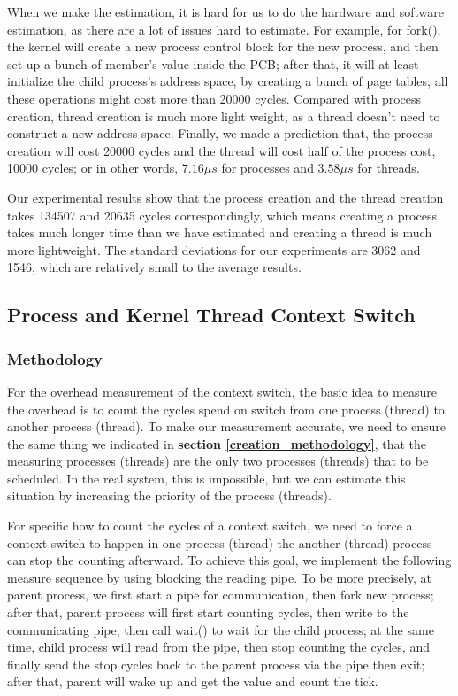 When we make the estimation, it is hard for us to do the hardware and software estimation, as there are a lot of issues hard to estimate. For example, for fork(), the kernel will create a new process control block for the new process, and then set
up a bunch of member's value inside the PCB; after that, it will at least initialize the child process's address space, by creating a bunch of page tables; all these operations might cost more than 20000 cycles. Compared with process creation,
thread creation is much more light weight, as a thread doesn't need to construct a new address space. Finally, we made a prediction that, the process creation will cost 20000 cycles and the thread will cost half of the process cost, 10000 cycles; or in other
words, $7.16 \mu s$ for processes and $3.58 \mu s$ for threads.

Our experimental results show that the process creation and the thread creation takes 134507 and 20635 cycles correspondingly, which means creating a process takes much longer time than we have estimated and creating a thread is much more lightweight. The standard deviations for our experiments are 3062 and 1546, which are relatively small to the average results.


\subsection{Process and Kernel Thread Context Switch}

\subsubsection{Methodology}

For the overhead measurement of the context switch, the basic idea to measure the overhead is to count the cycles spend on switch from one process (thread) to another process (thread). To make our measurement accurate, we need to ensure the same thing we indicated in
\textbf{section \ref{creation_methodology}}, that the measuring processes (threads) are the only two processes (threads) that to be scheduled. In the real system, this is impossible, but we can estimate this situation by increasing the priority of the process (threads).

For specific how to count the cycles of a context switch, we need to force a context switch to happen in one process (thread) the another (thread) process can stop the counting afterward. To achieve this goal, we implement the following measure sequence by using blocking
the reading pipe. To be more precisely, at parent process, we first start a pipe for communication, then fork new process; after that, parent process will first start counting cycles, then write to the communicating pipe, then call wait() to wait for the child process; at the same time, child process will read from the pipe, then stop counting the cycles, and finally send the stop cycles back to the parent process via the pipe then exit; after that, parent will wake up and get the value and count the tick.

